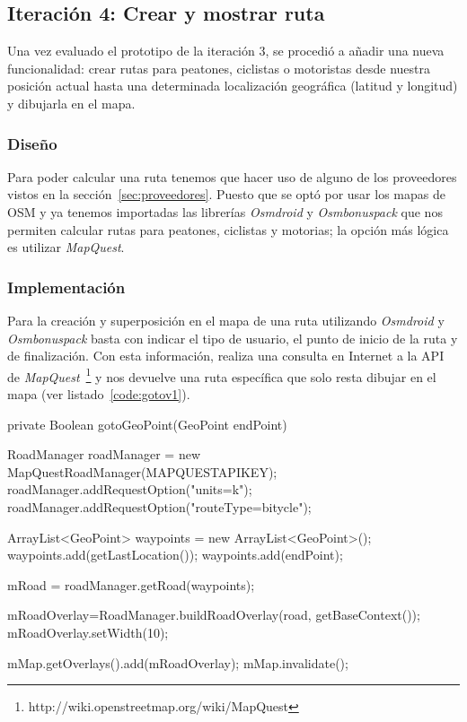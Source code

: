 \subsection{Iteración 4: Crear y mostrar ruta}
\label{sec:ite4}

Una vez evaluado el prototipo de la iteración 3, se procedió a añadir una nueva funcionalidad: crear
rutas para peatones, ciclistas o motoristas desde nuestra posición actual hasta una determinada
localización geográfica (latitud y longitud) y dibujarla en el mapa.

\subsubsection{Diseño}

Para poder calcular una ruta tenemos que hacer uso de alguno de los proveedores vistos en la
sección~\ref{sec:proveedores}. Puesto que se optó por usar los mapas de \acs{OSM} y ya tenemos
importadas las librerías \emph{Osmdroid} y \emph{Osmbonuspack} que nos permiten calcular rutas para
peatones, ciclistas y motorias; la opción más lógica es utilizar \emph{MapQuest}.

\subsubsection{Implementación}

Para la creación y superposición en el mapa de una ruta utilizando \emph{Osmdroid} y
\emph{Osmbonuspack} basta con indicar el tipo de usuario, el punto de inicio de la ruta y de
finalización. Con esta información, realiza una consulta en Internet a la \acs{API} de
\emph{MapQuest}~\footnote{http://wiki.openstreetmap.org/wiki/MapQuest} y nos devuelve una ruta
específica que solo resta dibujar en el mapa (ver listado~\ref{code:gotov1}).

\begin{listing}[
  float=ht,
  language = java,
  caption  = {Ejemplo de creación y superposición de una ruta en el mapa},
  label    = code:gotov1]
private Boolean gotoGeoPoint(GeoPoint endPoint) {
    RoadManager roadManager = new MapQuestRoadManager(MAPQUESTAPIKEY);
    roadManager.addRequestOption("units=k");
    roadManager.addRequestOption("routeType=bitycle");
    
    ArrayList<GeoPoint> waypoints = new ArrayList<GeoPoint>();
    waypoints.add(getLastLocation());
    waypoints.add(endPoint);
    
    mRoad = roadManager.getRoad(waypoints);
            
    mRoadOverlay=RoadManager.buildRoadOverlay(road, getBaseContext());
    mRoadOverlay.setWidth(10);

    mMap.getOverlays().add(mRoadOverlay);            
    mMap.invalidate();
}
\end{listing}

